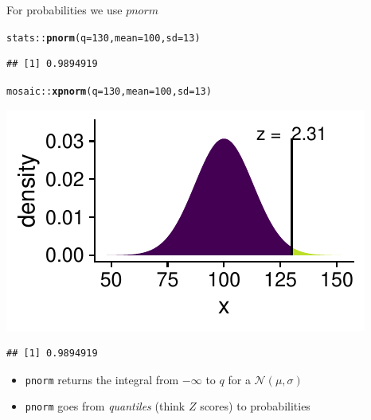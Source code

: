 \documentclass[10pt,handout]{beamer}\usepackage[]{graphicx}\usepackage[]{color}
\makeatletter
\newcommand{\hlnum}[1]{\textcolor[rgb]{0.686,0.059,0.569}{#1}}%
\newcommand{\hlopt}[1]{\textcolor[rgb]{0,0,0}{#1}}%
\newcommand{\hlstd}[1]{\textcolor[rgb]{0.345,0.345,0.345}{#1}}%
\newcommand{\hlkwc}[1]{\textcolor[rgb]{0.333,0.667,0.333}{#1}}%
\newcommand{\hlkwd}[1]{\textcolor[rgb]{0.737,0.353,0.396}{\textbf{#1}}}%
\newenvironment{kframe}{%
 \def\at@end@of@kframe{}%
 \ifinner\ifhmode%
  \def\at@end@of@kframe{\end{minipage}}%
  \begin{minipage}{\columnwidth}%
 \fi\fi%
 \def\FrameCommand##1{\hskip\@totalleftmargin \hskip-\fboxsep
 \colorbox{shadecolor}{##1}\hskip-\fboxsep
     \hskip-\linewidth \hskip-\@totalleftmargin \hskip\columnwidth}%
 \MakeFramed {\advance\hsize-\width
   \@totalleftmargin\z@ \linewidth\hsize
   \@setminipage}}%
 {\par\unskip\endMakeFramed%
 \at@end@of@kframe}
\newenvironment{knitrout}{}{} %
\makeatother
\begin{document}
\begin{frame}[fragile]{For probabilities we use $pnorm$}
	
	
\begin{knitrout}\tiny
{}\color{fgcolor}\begin{kframe}
\begin{alltt}
\hlstd{stats}\hlopt{::}\hlkwd{pnorm}\hlstd{(}\hlkwc{q} \hlstd{=} \hlnum{130}\hlstd{,} \hlkwc{mean} \hlstd{=} \hlnum{100}\hlstd{,} \hlkwc{sd} \hlstd{=} \hlnum{13}\hlstd{)}
\end{alltt}
\begin{verbatim}
## [1] 0.9894919
\end{verbatim}
\end{kframe}
\end{knitrout}
	
	\pause 
	
\begin{knitrout}\tiny
{}\color{fgcolor}\begin{kframe}
\begin{alltt}
\hlstd{mosaic}\hlopt{::}\hlkwd{xpnorm}\hlstd{(}\hlkwc{q} \hlstd{=} \hlnum{130}\hlstd{,} \hlkwc{mean} \hlstd{=} \hlnum{100}\hlstd{,} \hlkwc{sd} \hlstd{=} \hlnum{13}\hlstd{)}
\end{alltt}
\end{kframe}

{\centering \includegraphics[width=0.6\linewidth]{figure/probs3-1} 

}


\begin{kframe}\begin{verbatim}
## [1] 0.9894919
\end{verbatim}
\end{kframe}
\end{knitrout}
	
	\pause 
	
	\begin{itemize}
		\item \texttt{pnorm} returns the integral from $-\infty$ to $q$ for a $\mathcal{N}(\mu, \sigma)$
		\item \texttt{pnorm} goes from \textit{quantiles} (think $Z$ scores) to probabilities
	\end{itemize}
	
\end{frame}
\end{document}

